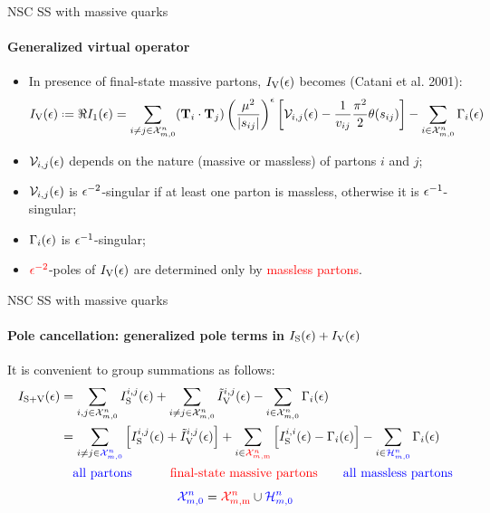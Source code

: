 
\begin{frame}{NSC SS with massive quarks}
  \framesubtitle{Generalized virtual operator}

  \justifying
  \begin{itemize}[<+->]
    \item In presence of final-state massive partons, $ I_\text{V}(\epsilon) $ becomes (Catani et al. 2001):
    \begin{equation*}
      \ivo(\de) \defeq \Re \ioo(\de) = \sum_{i \neq j \in \fsp{n}{m}} (\cc) \left( \frac{\mu^2}{\abs{s_{ij}}} \right)^\de \left[ \ns_{i,j}(\de) - \frac{1}{v_{ij}} \frac{\pi^2}{2} \theta(s_{ij}) \right] - \sum_{i \in \fsp{n}{m}} \Gamma_i(\de)
    \end{equation*}
    \item $ \mathcal{V}_{i,j}(\epsilon) $ depends on the nature (massive or massless) of partons $ i $ and $ j $;
    \item $ \mathcal{V}_{i,j}(\epsilon) $ is $ \epsilon^{-2} $-singular if at least one parton is massless, otherwise it is $ \epsilon^{-1} $-singular;
    \item $ \Gamma_i(\epsilon) $ is $ \epsilon^{-1} $-singular;
    \item $ \textcolor{red}{\epsilon^{-2}} $-poles of $ I_\text{V}(\epsilon) $ are determined only by \textcolor{red}{massless partons}.
  \end{itemize}

\end{frame}


\begin{frame}{NSC SS with massive quarks}
  \framesubtitle{Pole cancellation: generalized pole terms in $ I_\text{S}(\epsilon) + I_\text{V}(\epsilon) $}

  It is convenient to group summations as follows:
  \begin{equation*}
    \begin{split}
      I_{\text{S}+\text{V}}(\epsilon)
      & = \sum_{i,j \in \mathcal{X}^{n}_{m,0}} I_\text{S}^{i,j}(\epsilon) + \sum_{i \neq j \in \mathcal{X}^{n}_{m,0}} \tilde{I}_\text{V}^{i,j}(\epsilon) - \sum_{i \in \mathcal{X}^{n}_{m,0}} \Gamma_i(\epsilon) \\
      & = \sum_{i \neq j \in \textcolor{blue}{\mathcal{X}^{n}_{m,0}}} \left[ I_\text{S}^{i,j}(\epsilon) + \tilde{I}_\text{V}^{i,j}(\epsilon) \right] + \sum_{i \in \textcolor{red}{\mathcal{X}^{n}_{m,\text{m}}}} \left[ I_\text{S}^{i,i}(\epsilon) - \Gamma_i(\epsilon) \right] - \sum_{i \in \textcolor{blue}{\mathcal{H}^{n}_{m,0}}} \Gamma_i(\epsilon) \\
      & \quad \textcolor{blue}{\text{all partons}} \qquad \quad \textcolor{red}{\text{final-state massive partons}} \qquad \textcolor{blue}{\text{all massless partons}}
    \end{split}
  \end{equation*}
  \begin{equation*}
    \textcolor{blue}{\mathcal{X}^{n}_{m,0}} = \textcolor{red}{\mathcal{X}^{n}_{m,\text{m}}} \cup \textcolor{blue}{\mathcal{H}^{n}_{m,0}}
  \end{equation*}

  \vspace{2.3em}

\end{frame}

